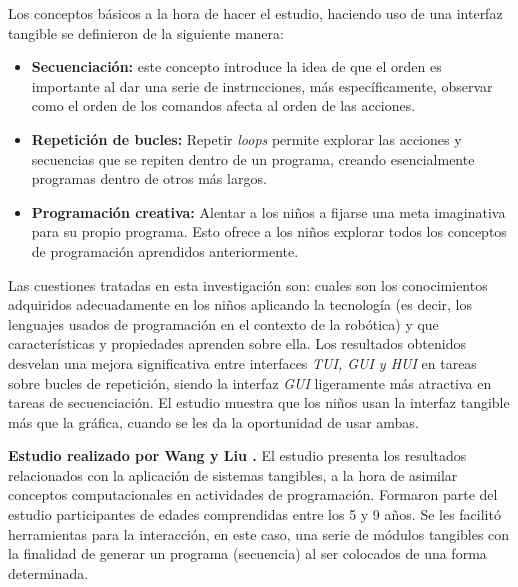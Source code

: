 Los conceptos básicos a la hora de hacer el estudio, haciendo uso de una interfaz tangible se definieron de la siguiente manera:
\begin{itemize}
\item \textbf{Secuenciación:} este concepto introduce la idea de que el orden es importante al dar una serie de instrucciones, más específicamente, observar como el orden de los comandos afecta al orden de las acciones.
\item \textbf{Repetición de bucles:} Repetir \emph{loops} permite explorar las acciones y secuencias que se repiten dentro de un programa, creando esencialmente programas dentro de otros más largos.
\item \textbf{Programación creativa:} Alentar a los niños a fijarse una meta imaginativa para su propio programa. Esto ofrece a los niños explorar todos los conceptos de programación aprendidos anteriormente.
\end{itemize}

Las cuestiones tratadas en esta investigación son: cuales son los conocimientos adquiridos adecuadamente en los niños aplicando la tecnología (es decir, los lenguajes usados de programación en el contexto de la robótica) y que características y propiedades aprenden sobre ella. Los resultados obtenidos desvelan una mejora significativa entre interfaces \emph{TUI, GUI y HUI} en tareas sobre bucles de repetición, siendo la interfaz \emph{GUI} ligeramente más atractiva en tareas de secuenciación.
El estudio muestra que los niños usan la interfaz tangible más que la gráfica, cuando se les da la oportunidad de usar ambas.



\textbf{Estudio realizado por Wang y Liu \cite{Wang_2015}.} El estudio presenta los resultados relacionados con la aplicación de sistemas tangibles, a la hora de asimilar conceptos computacionales en actividades de programación. Formaron parte del estudio participantes de edades comprendidas entre los 5 y 9 años. Se les facilitó herramientas para la interacción, en este caso, una serie de módulos tangibles con la finalidad de generar un programa (secuencia) al ser colocados de una forma determinada. 

